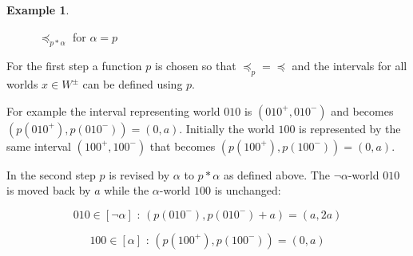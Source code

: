 \documentclass[english, 12pt]{scrartcl}
\theoremstyle{definition}
\newtheorem{example}{Example}[section]
\theoremstyle{definition}
\theoremstyle{definition}
\begin{document}
\begin{example}
\begin{figure}[h]
            \caption{$\preceq_{p \ast \alpha}$ for $\alpha = p$}
            \label{fig:example-preceq-revised}
    \end{figure}
    
    For the first step a function $p$ is chosen so that $\preceq_{p} = \preceq$ and the intervals for all worlds $x \in W^{\pm}$ can be defined using $p$.
    
    For example the interval representing world $010$ is $(010^{+}, 010^{-})$ and becomes $(p(010^{+}), p(010^{-})) = (0, a)$. Initially the world $100$ is represented by the same interval $(100^{+}, 100^{-})$ that becomes $(p(100^{+}), p(100^{-})) = (0, a)$.
    
    \bigskip
    
    In the second step $p$ is revised by $\alpha$ to $p \ast \alpha$ as defined above. The $\neg\alpha$-world $010$ is moved back by $a$ while the $\alpha$-world $100$ is unchanged:
    
    \begin{equation*}
        010 \in [\neg\alpha] \textrm{ : } (p(010^{-}), p(010^{-}) + a) = (a, 2a)
    \end{equation*}
    
    \begin{equation*}
        100 \in [\alpha] \textrm{ : } (p(100^{+}), p(100^{-})) = (0, a)
    \end{equation*}
\end{example}
\end{document}
